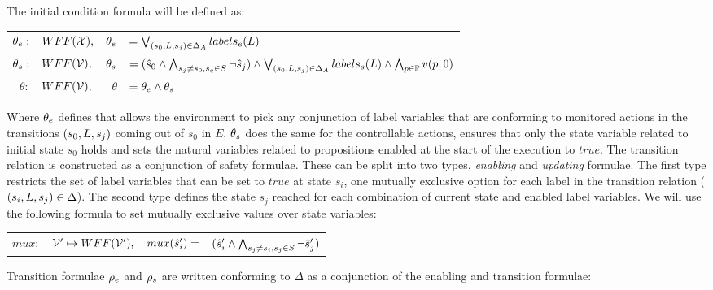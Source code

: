 The initial condition formula will be defined as:
\begin{center}
	\begin{tabular}{r l r l}
		${\theta_e}:$&$WFF({\mathcal{X}}),$ &
		${\theta_e}$&$= \bigvee_{(s_0,L,s_j) \in \Delta_A}labels_e(L)$\\
		${\theta_s}:$&$WFF({\mathcal{V}}),$ &
		${\theta_s}$&$= (\hat{s}_{0} \wedge\bigwedge_{s_j \neq s_0, s_q \in S}\neg \hat{s}_{j}) \wedge \bigvee_{(s_0,L,s_j) \in \Delta_A}labels_s(L) \wedge \bigwedge_{p \in \mathbb{P}}v(p,0)$\\
		$\theta:$&$WFF({\mathcal{V}}),$ &
		$\theta$&$= {\theta_e} \wedge {\theta_s}$\\		
	\end{tabular}
\end{center}

Where ${\theta_e}$ defines that allows the environment to pick any conjunction of label variables that are conforming to monitored actions in the transitions $(s_0, L, s_j)$ coming out of $s_0$ in $E$, ${\theta_s}$ does the same for the controllable actions, ensures that only the state variable related to initial state $s_0$ holds and sets the natural variables related to propositions enabled at the start of the execution to $true$.
The transition relation is constructed as a conjunction of safety formulae. These can be split into two types, \emph{enabling} and \emph{updating} formulae. The first type restricts the set of label variables that can be set to $true$ at state $s_i$, one mutually exclusive option for each label \actionLabel in the transition relation ($(s_i,L,s_j) \in \Delta$). The second type defines the state $s_j$ reached for each combination of current state and enabled label variables. 
We will use the following formula to set mutually exclusive values over state variables:

\begin{center}
	\begin{tabular}{r r r l}
$mux:$&${\mathcal{V}}' \mapsto WFF({\mathcal{V}}'),$&$mux(\hat{s}_{i}') = $&$(\hat{s}_{i}' \wedge\bigwedge_{s_j \neq s_i, s_j \in S}\neg \hat{s}_{j}')$
	\end{tabular}
\end{center}

Transition formulae ${\rho_e}$ and ${\rho_s}$ are written conforming to $\Delta$ as a conjunction of the enabling and transition formulae:

